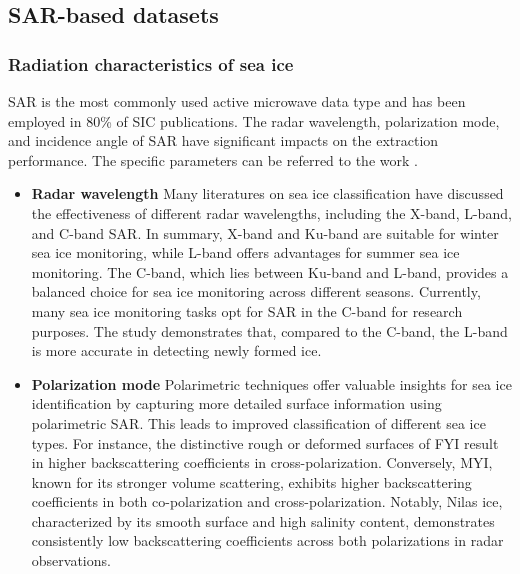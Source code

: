 \subsection {SAR-based datasets}

\subsubsection {Radiation characteristics of sea ice}
SAR is the most commonly used active microwave data type and has been employed in 80\% of SIC publications. The radar wavelength, polarization mode, and incidence angle of SAR have significant impacts on the extraction performance. The specific parameters can be referred to the work \cite{156murfitt202150}.
\begin{itemize}
\item \textbf{Radar wavelength} Many literatures on sea ice classification have discussed the effectiveness of different radar wavelengths, including the X-band, L-band, and C-band SAR. In summary, X-band and Ku-band are suitable for winter sea ice monitoring, while L-band offers advantages for summer sea ice monitoring. The C-band, which lies between Ku-band and L-band, provides a balanced choice for sea ice monitoring across different seasons. Currently, many sea ice monitoring tasks opt for SAR in the C-band for research purposes. The study \cite{154MAHMUD2022113129} demonstrates that, compared to the C-band, the L-band is more accurate in detecting newly formed ice.

\item \textbf{Polarization mode} Polarimetric techniques offer valuable insights for sea ice identification by capturing more detailed surface information using polarimetric SAR. This leads to improved classification of different sea ice types. For instance, the distinctive rough or deformed surfaces of FYI result in higher backscattering coefficients in cross-polarization. Conversely, MYI, known for its stronger volume scattering, exhibits higher backscattering coefficients in both co-polarization and cross-polarization. Notably, Nilas ice, characterized by its smooth surface and high salinity content, demonstrates consistently low backscattering coefficients across both polarizations in radar observations.


\end{itemize}
